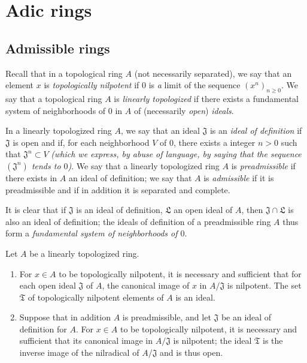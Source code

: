 \section{Adic rings}
\label{section:0.7}

\subsection{Admissible rings}
\label{subsection:0.7.1}

\begin{env}[7.1.1]
\label{0.7.1.1}
Recall that in a topological ring $A$ (not necessarily separated), we say that an element $x$
is \emph{topologically nilpotent} if $0$ is \emph{a} limit of the sequence
$(x^n)_{n\geq 0}$. We say that a topological ring $A$ is \emph{linearly topologized} if
there exists a fundamental system of neighborhoods of $0$ in $A$ of (necessarily \emph{open})
\emph{ideals}.
\end{env}

\begin{definition}[7.1.2]
\label{0.7.1.2}
In a linearly topologized ring $A$, we say that an ideal $\mathfrak{J}$ is an \emph{ideal of
definition} if $\mathfrak{J}$ is open and if, for each neighborhood $V$ of $0$, there exists
a integer $n>0$ such
that $\mathfrak{J}^n\subset V$ \emph{(which we express, by abuse of language, by saying that
the sequence $(\mathfrak{J}^n)$ \emph{tends to $0$})}. We say that a linearly topologized
ring $A$ is \emph{preadmissible} if there exists in $A$ an ideal of definition; we say that
$A$ is \emph{admissible} if it is preadmissible and if in addition it is separated and
complete.
\end{definition}

It is clear that if $\mathfrak{J}$ is an ideal of definition, $\mathfrak{L}$ an open ideal of
$A$, then $\mathfrak{J}\cap\mathfrak{L}$ is also an ideal of definition; the ideals of
definition of a preadmissible ring $A$ thus form a \emph{fundamental system of neighborhoods
of $0$}.

\begin{lemma}[7.1.3]
\label{0.7.1.3}
Let $A$ be a linearly topologized ring.
\begin{enumerate}[label=\emph{(\roman*)}]
  \item For $x\in A$ to be topologically nilpotent, it is necessary and sufficient that for
    each open ideal $\mathfrak{J}$ of $A$, the canonical image of $x$ in $A/\mathfrak{J}$ is
    nilpotent. The set $\mathfrak{T}$ of topologically nilpotent elements of $A$ is an ideal.
  \item Suppose that in addition $A$ is preadmissible, and let $\mathfrak{J}$ be an ideal
    of definition for $A$. For $x\in A$ to be topologically nilpotent, it is necessary and
    sufficient that its canonical image in $A/\mathfrak{J}$ is nilpotent; the ideal
    $\mathfrak{T}$ is the inverse image of the nilradical of $A/\mathfrak{J}$ and is thus open.
\end{enumerate}
\end{lemma}

